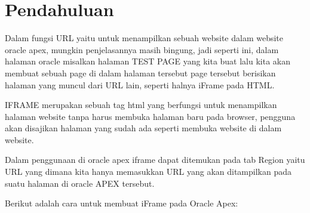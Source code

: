 \section{Pendahuluan}
Dalam fungsi URL yaitu untuk menampilkan sebuah website dalam website oracle apex, mungkin penjelasannya masih bingung, jadi seperti ini, dalam halaman oracle misalkan halaman TEST PAGE yang kita buat lalu kita akan membuat sebuah page di dalam halaman tersebut page tersebut berisikan halaman yang muncul dari URL lain, seperti halnya iFrame pada HTML.

\par IFRAME merupakan sebuah tag html yang berfungsi untuk menampilkan halaman website tanpa harus membuka halaman baru pada browser, pengguna akan disajikan halaman yang sudah ada seperti membuka website di dalam website.

\par Dalam penggunaan di oracle apex iframe dapat ditemukan pada tab Region yaitu URL yang dimana kita hanya memasukkan URL yang akan ditampilkan pada suatu halaman di oracle APEX tersebut.

\par Berikut adalah cara untuk membuat iFrame pada Oracle Apex:

